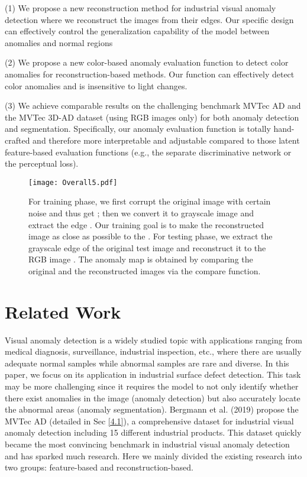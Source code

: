 \documentclass[5p, twocolumn]{elsarticle}[draft]
\begin{document}
(1) We propose a new reconstruction method for industrial visual anomaly detection where we reconstruct the images from their edges. Our specific design can effectively control the generalization capability of the model between anomalies and normal regions

(2) We propose a new color-based anomaly evaluation function to detect color anomalies for reconstruction-based methods. Our function can effectively detect color anomalies and is insensitive to light changes.

(3) We achieve comparable results on the challenging benchmark MVTec AD and the MVTec 3D-AD dataset (using RGB images only) for both anomaly detection and segmentation. Specifically, our anomaly evaluation function is totally hand-crafted and therefore more interpretable and adjustable compared to those latent feature-based evaluation functions (e.g., the separate discriminative network or the perceptual loss).    

\begin{figure}
    \centering
		\texttt{[image: Overall5.pdf]}
	\caption{For training phase, we first corrupt the original image  with certain noise and thus get ; then we convert it to grayscale image  and extract the edge . Our training goal is to make the reconstructed image  as close as possible to the . For testing phase, we extract the grayscale edge  of the original test image  and reconstruct it to the RGB image . The anomaly map  is obtained by comparing the original and the reconstructed images via the compare function.}
	\label{FIG:1}
\end{figure}

\section{Related Work}
\label{20}
Visual anomaly detection is a widely studied topic with applications ranging from medical diagnosis\cite{schlegl2019f}, surveillance\cite{liu2018future}, industrial inspection\cite{tao2022deep}, etc., where there are usually adequate normal samples while abnormal samples are rare and diverse. In this paper, we focus on its application in industrial surface defect detection. This task may be more challenging since it requires the model to not only identify whether there exist anomalies in the image (anomaly detection) but also accurately locate the abnormal areas (anomaly segmentation). Bergmann et al. (2019) \cite{bergmann2019mvtec} propose the MVTec AD (detailed in Sec \ref{4.1}), a comprehensive dataset for industrial visual anomaly detection including 15 different industrial products. This dataset quickly became the most convincing benchmark in industrial visual anomaly detection and has sparked much research. Here we mainly divided the existing research into two groups: feature-based and reconstruction-based.
\end{document}
